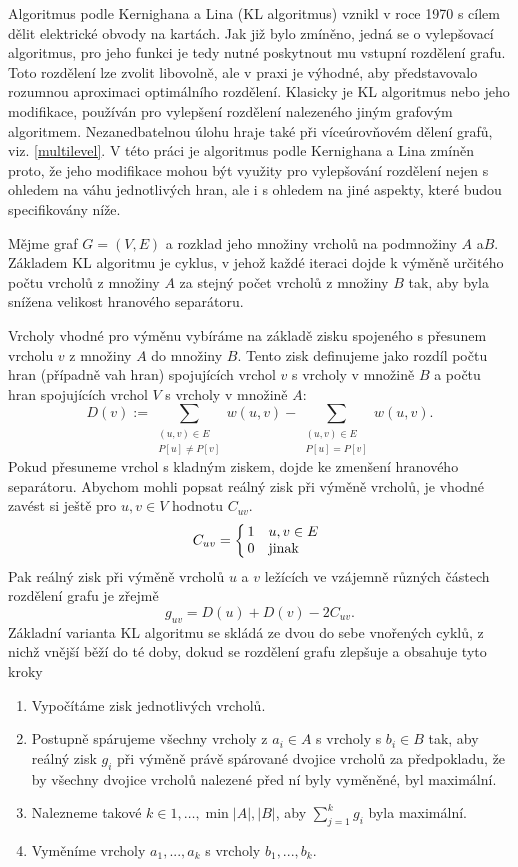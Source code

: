 \documentclass[11pt,american,czech,oneside]{book}
\theoremstyle{plain}
\theoremstyle{definition}
\begin{document}
Algoritmus podle Kernighana a Lina (KL algoritmus) vznikl v roce 1970 s cílem dělit elektrické obvody na kartách.
Jak již bylo zmíněno, jedná se o vylepšovací algoritmus, pro jeho funkci je tedy nutné poskytnout mu vstupní rozdělení grafu. Toto rozdělení lze zvolit libovolně, ale v praxi je výhodné, aby představovalo  rozumnou aproximaci optimálního rozdělení. Klasicky je KL algoritmus nebo jeho modifikace, používán pro vylepšení rozdělení nalezeného jiným grafovým algoritmem. Nezanedbatelnou úlohu hraje také při víceúrovňovém dělení grafů, viz. \ref{multilevel}.
V této práci je algoritmus podle Kernighana a Lina zmíněn proto, že jeho modifikace mohou být využity pro vylepšování rozdělení nejen s ohledem na váhu jednotlivých hran, ale i s ohledem na jiné aspekty, které budou specifikovány níže.

Mějme graf $G=(V,E)$ a rozklad jeho množiny vrcholů na podmnožiny $A$ a$B$. Základem KL algoritmu je cyklus, v jehož každé iteraci dojde k výměně určitého počtu vrcholů z množiny $A$ za stejný počet vrcholů z množiny $B$ tak, aby byla snížena velikost hranového separátoru.

Vrcholy vhodné pro výměnu vybíráme na základě zisku spojeného s přesunem vrcholu $v$ z množiny $A$ do množiny $B$. Tento zisk definujeme jako rozdíl počtu hran (případně vah hran) spojujících vrchol $v$ s vrcholy v množině $B$ a počtu hran spojujících vrchol $V$ s vrcholy v množině $A$:
\[
D(v) := \sum\limits_{\substack{(u,v) \in E \\ P[u] \neq P[v]}}w(u,v) - \sum\limits_{\substack{(u,v) \in E \\ P[u] = P[v]}}w(u,v).
\]
Pokud přesuneme vrchol s kladným ziskem, dojde ke zmenšení hranového separátoru.
Abychom mohli popsat reálný zisk při výměně vrcholů, je vhodné zavést si ještě pro $u,v \in V$ hodnotu $C_{uv}$.
\[
C_{uv}=
    \left\{
    \begin{array}{@{\,}ll}
		1  & \mbox{} {u,v} \in E\\
		0 & \mbox{jinak}
	\end{array}
\right.
\]
Pak reálný zisk při výměně vrcholů $u$ a $v$ ležících ve vzájemně různých částech rozdělení grafu je zřejmě
\[
g_{uv}=D(u)+D(v)-2C_{uv}.
\]
Základní varianta KL algoritmu se skládá ze dvou do sebe vnořených cyklů, z nichž vnější běží do té doby, dokud se rozdělení grafu zlepšuje a obsahuje tyto kroky
\begin{enumerate}
  \item Vypočítáme zisk jednotlivých vrcholů.
  \item Postupně spárujeme všechny vrcholy z $a_i \in A$ s vrcholy s $b_i \in B$ tak, aby reálný zisk $g_i$ při výměně právě spárované dvojice vrcholů za předpokladu, že by všechny dvojice vrcholů nalezené před ní byly vyměněné, byl maximální.
  \item Nalezneme takové $k \in {1,\ldots,\min{|A|,|B|}}$, aby $\sum_{j=1}^{k}g_i$ byla maximální.
  \item Vyměníme vrcholy $a_1,...,a_k$ s vrcholy $b_1,...,b_k$.
\end{enumerate}
\end{document}
